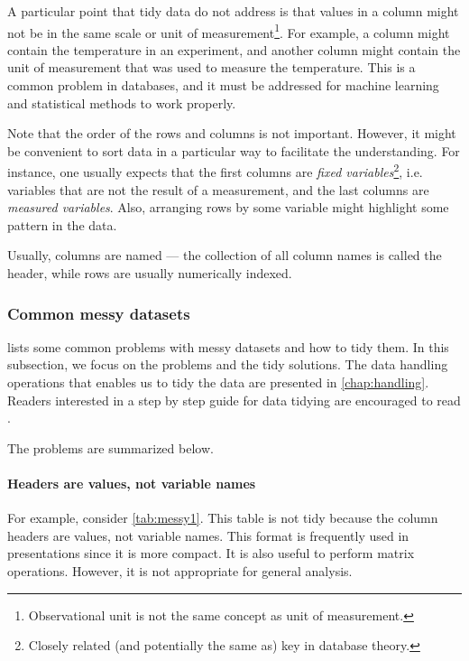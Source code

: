 A particular point that tidy data do not address is that values in a column might not be
in the same scale or unit of measurement\footnote{Observational unit is not the same
concept as unit of measurement.}.  For example, a column might contain the
temperature in an experiment, and another column might contain the unit of measurement
that was used to measure the temperature.  This is a common problem in databases, and it
must be addressed for machine learning and statistical methods to work properly.

Note that the order of the rows and columns is not important.  However, it might be
convenient to sort data in a particular way to facilitate the understanding.  For
instance, one usually expects that the first columns are \emph{fixed
variables}\footnote{Closely related (and potentially the same as) key in database
theory.}, i.e. variables that are not the result of a measurement, and the last columns
are \emph{measured variables}.  Also, arranging rows by some variable might highlight some
pattern in the data.

Usually, columns are named --- the collection of all column names is called the
header, while rows are usually numerically indexed.

\subsubsection{Common messy datasets}

\textcite{Wickham2014} lists some common problems with messy
datasets and how to tidy them.  In this subsection, we focus on the problems and the
tidy solutions.  The data handling operations that enables us to tidy the data are
presented in \cref{chap:handling}.  Readers interested in a step by step guide for data
tidying are encouraged to read \textcite{Wickham2023}.

The problems are summarized below.

\clearpage
\paragraph{Headers are values, not variable names}  For example, consider
\cref{tab:messy1}.  This table is not tidy because the column headers are values, not
variable names.  This format is frequently used in presentations since it is more compact.
It is also useful to perform matrix operations. However, it is not appropriate for general
analysis.

